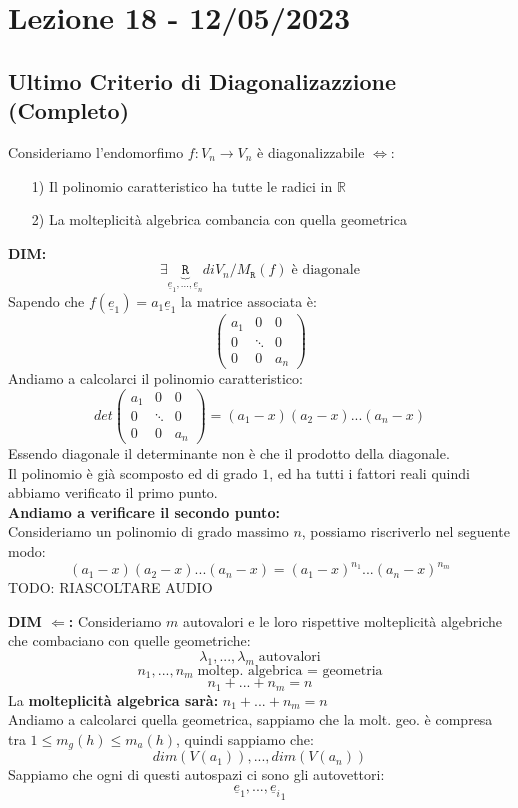 \section{Lezione 18 - 12/05/2023}

\subsection{Ultimo Criterio di Diagonalizazzione (Completo)}
Consideriamo l'endomorfimo $f: V_n \rightarrow V_n$ è diagonalizzabile $\Leftrightarrow$:
\begin{itemize}
\item[1)]Il polinomio caratteristico ha tutte le radici in $\mathbb{R}$
\item[2)]La molteplicità algebrica combancia con quella geometrica
\end{itemize}
\textbf{DIM:}
$$ 
\exists \underbrace{\mathtt{R}}_{\underline{e}_1,...,\underline{e}_n} di V_n/ M_{\mathtt{R}}(f) \; \text{è diagonale} 
$$
Sapendo che $f(\underline{e}_1) = a_1\underline{e}_1$ la matrice associata è:
$$ 
\begin{pmatrix}
a_1 & 0 & 0\\
0 & \ddots & 0 \\
0 & 0 & a_n
\end{pmatrix}
$$
Andiamo a calcolarci il polinomio caratteristico:
$$ 
det \begin{pmatrix}
a_1 & 0 & 0\\
0 & \ddots & 0 \\
0 & 0 & a_n
\end{pmatrix}
= (a_1-x)(a_2-x)...(a_n-x)
$$
Essendo diagonale il determinante non è che il prodotto della diagonale.\\
Il polinomio è già scomposto ed di grado $1$, ed ha tutti i fattori reali quindi abbiamo verificato il primo punto.\\
\textbf{Andiamo a verificare il secondo punto:}\\
Consideriamo un polinomio di grado massimo $n$, possiamo riscriverlo nel seguente modo:
$$ (a_1-x)(a_2-x)...(a_n-x) = (a_1-x)^{n_1}...(a_n-x)^{n_m} $$
TODO: RIASCOLTARE AUDIO

\textbf{DIM $\Leftarrow$:}
Consideriamo $m$ autovalori e le loro rispettive molteplicità algebriche che combaciano con quelle geometriche:
$$ \lambda_1,...,\lambda_m \; \text{autovalori} $$
$$ n_1,...,n_m \; \text{moltep. algebrica = geometria} $$
$$ n_1+...+n_m = n $$
La \textbf{molteplicità algebrica sarà:} $n_1+...+n_m=n$\\
Andiamo a calcolarci quella geometrica, sappiamo che la molt. geo. è compresa tra $1 \le m_g(h) \le m_a(h)$, quindi sappiamo che:
$$ dim(V(a_1)),...,dim(V(a_n)) $$
Sappiamo che ogni di questi autospazi ci sono gli autovettori:
$$ \underline{e}_1,...,{\underline{e}_i}_1 $$



